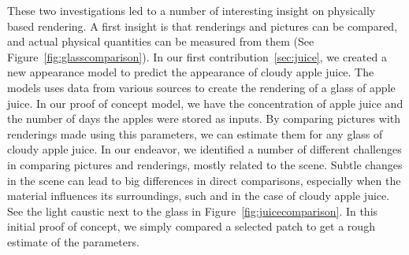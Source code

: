 These two investigations led to a number of interesting insight on physically based rendering. A first insight is that renderings and pictures can be compared, and actual physical quantities can be measured from them (See Figure~\ref{fig:glasscomparison}). In our first contribution~\ref{sec:juice}, we created a new appearance model to predict the appearance of cloudy apple juice. The models uses data from various sources to create the rendering of a glass of apple juice. In our proof of concept model, we have the concentration of apple juice and the number of days the apples were stored as inputs. By comparing pictures with renderings made using this parameters, we can estimate them for any glass of cloudy apple juice. In our endeavor, we identified a number of different challenges in comparing pictures and renderings, mostly related to the scene. Subtle changes in the scene can lead to big differences in direct comparisons, especially when the material influences its surroundings, such and in the case of cloudy apple juice. See the light caustic next to the glass in Figure~\ref{fig:juicecomparison}. In this initial proof of concept, we simply compared a selected patch to get a rough estimate of the parameters.


